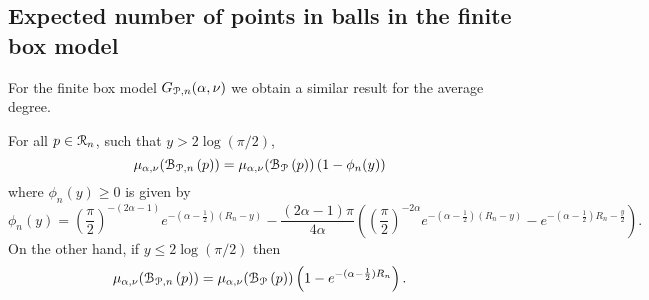 \subsection{Expected number of points in balls in the finite box model}\label{ssec:average_degree_P_n}

For the finite box model $G_{{\mathcal P},n}(\alpha, \nu)$ we obtain a similar result for the average degree.

\begin{lemma}\label{lem:average_degree_P_n}
For all $p \in {\mathcal R}_n$, such that $y > 2\log(\pi/2)$,
\[
	\mu_{\alpha,\nu}({\mathcal B}_{{\mathcal P},n}\left(p\right)) = \mu_{\alpha,\nu}({\mathcal B}_{{\mathcal P}}\left(p\right))\left(1 - \phi_n(y)\right)
\]
where $\phi_n(y) \ge 0$ is given by
\[
	\phi_n(y) = \left(\frac{\pi}{2}\right)^{-(2\alpha - 1)}e^{-(\alpha-\frac{1}{2})(R_n - y)}
	- \frac{(2\alpha - 1)\pi}{4\alpha}\left(\left(\frac{\pi}{2}\right)^{-2\alpha} 
	e^{-(\alpha - \frac{1}{2})(R_n - y)} - e^{-(\alpha - \frac{1}{2})R_n - \frac{y}{2}}\right).
\]
On the other hand, if $y \le 2 \log(\pi/2)$ then
\[
	\mu_{\alpha,\nu}({\mathcal B}_{{\mathcal P},n}\left(p\right)) = \mu_{\alpha,\nu}({\mathcal B}_{{\mathcal P}}\left(p\right))\left(1 - e^{-(\alpha - \frac{1}{2})R_n}\right).
\]
\end{lemma}

